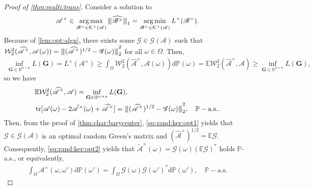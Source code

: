 \documentclass[noinfoline]{imsart}\setcounter{tocdepth}{2}
\renewcommand{\b}[1]{\mathbb{#1}} %
\newcommand{\m}[1]{\mathbf{#1}} %
\newcommand{\s}[1]{\mathscr{#1}} %
\renewcommand{\c}[1]{\mathcal{#1}} %
\newcommand{\rd}{\mathrm{d}} %
\DeclareMathOperator*{\tr}{tr}
\DeclareMathOperator*{\argmin}{\arg\min}
\DeclareMathOperator*{\argmax}{\arg\max}
\newcommand{\vertii}[1]{{\vert\kern-0.25ex\vert\kern-0.25ex\vert #1 
    \vert\kern-0.25ex\vert\kern-0.25ex\vert}} %
\theoremstyle{plain}
\begin{document}
\begin{proof}[Proof of \cref{thm:multi:trans}]
Consider a solution to
\begin{align*}
    \s{A}^{\times} \in \argmax_{\s{B}^{\times} \in \c{K}^{\times}(\s{A})} \vertii{\widehat{\s{B}^{\times}}}_{1} = \argmin_{\s{B}^{\times} \in \c{K}^{\times}(\s{A})} L^{\times}(\s{B}^{\times}).
\end{align*}
Because of \cref{lem:opt:algn}, there exists some $\s{G} \in \c{G}(\s{A})$ such that $\c{W}_{2}^{2}(\widehat{\s{A}}^{\times}, \s{A}(\omega)) = \vertii{(\widehat{\s{A}}^{\times})^{1/2} - \s{G}(\omega)}_{2}^{2}$ for all $\omega \in \Omega$. Then, 
\begin{align*}
    \inf_{\m{G} \in \b{R}^{n \times n}} L(\m{G}) = L^{\times}(\s{A}^{\times}) \ge \int_{\Omega} \c{W}_{2}^{2}(\widehat{\s{A}}^{\times}, \s{A}(\omega)) \rd \b{P}(\omega) = \b{E} \c{W}_{2}^{2}(\widehat{\s{A}}^{\times}, \s{A}) \ge \inf_{\m{G} \in \b{R}^{n \times n}} L(\m{G}),
\end{align*}
so we have
\begin{align}
    &\b{E} \c{W}_{2}^{2}(\widehat{\s{A}}^{\times}, \s{A}) = \inf_{\m{G} \in \b{R}^{n \times n}} L(\m{G}), \label{eq:rand:ker:opt1} \\
    &\tr[\s{A}(\omega) - 2 \tilde{\s{A}}^{\times}(\omega) + \widehat{\s{A}}^{\times}] = \vertii{(\widehat{\s{A}}^{\times})^{1/2} - \s{G}(\omega)}_{2}^{2}, \quad \b{P}-\text{a.s.}. \label{eq:rand:ker:opt2}
\end{align}
Then, from the proof of \cref{thm:char:barycenter}, \eqref{eq:rand:ker:opt1} yields that $\s{G} \in \c{G}(\s{A})$ is an optimal random Green's matrix and $(\widehat{\s{A}}^{\times})^{1/2} = \b{E} \s{G}$. Consequently, \eqref{eq:rand:ker:opt2} yields that $\tilde{\s{A}}^{\times}(\omega) = \s{G}(\omega) (\b{E} \s{G})^{*}$ holds $\b{P}$-a.s.,
or equivalently,
\begin{align*}
    \int_{\Omega} \s{A}^{\times}(\omega, \omega') \rd \b{P}(\omega') = \int_{\Omega} \s{G}(\omega)  \s{G}(\omega')^{*} \rd \b{P}(\omega'), \quad \b{P}-\text{a.s.}
\end{align*}
\end{proof}
\end{document}
